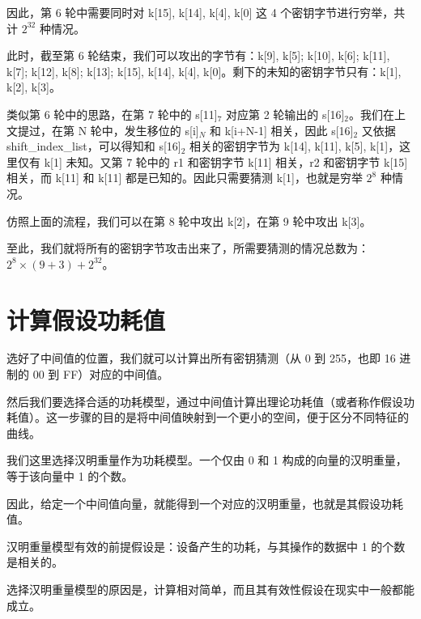 因此，第 6 轮中需要同时对 {\cnsls k[15], k[14], k[4], k[0]} 这 4 个密钥字节进行穷举，共计 $2^{32}$ 种情况。

\vspace*{0.5\baselineskip}

此时，截至第 6 轮结束，我们可以攻出的字节有：{\cnsls k[9], k[5]; k[10], k[6]; k[11], k[7]; k[12], k[8]; k[13]; k[15], k[14], k[4], k[0]}。剩下的未知的密钥字节只有：{\cnsls k[1], k[2], k[3]}。

\vspace*{0.5\baselineskip}

类似第 6 轮中的思路，在第 7 轮中的 {\cnsls s[11]$_7$} 对应第 2 轮输出的 {\cnsls s[16]$_2$}。我们在上文提过，在第 N 轮中，发生移位的 {\cnsls s[i]$_N$} 和 {\cnsls k[i+N-1]} 相关，因此 {\cnsls s[16]$_2$} 又依据 {\cnsls shift\_index\_list}，可以得知和 {\cnsls s[16]$_2$} 相关的密钥字节为 {\cnsls k[14], k[11], k[5], k[1]}，这里仅有 {\cnsls k[1]} 未知。又第 7 轮中的 {\cnsls r1} 和密钥字节 {\cnsls k[11]} 相关，{\cnsls r2} 和密钥字节 {\cnsls k[15]} 相关，而 {\cnsls k[11]} 和 {\cnsls k[11]} 都是已知的。因此只需要猜测 {\cnsls k[1]}，也就是穷举 $2^8$ 种情况。

仿照上面的流程，我们可以在第 8 轮中攻出 {\cnsls k[2]}，在第 9 轮中攻出 {\cnsls k[3]}。

\vspace*{0.5\baselineskip}

至此，我们就将所有的密钥字节攻击出来了，所需要猜测的情况总数为：$2^8 \times (9+3) + 2^{32}$。

\newpage

\section{计算假设功耗值}

选好了中间值的位置，我们就可以计算出所有密钥猜测（从 0 到 255，也即 16 进制的 00 到 FF）对应的中间值。

然后我们要选择合适的功耗模型，通过中间值计算出理论功耗值（或者称作假设功耗值）。这一步骤的目的是将中间值映射到一个更小的空间，便于区分不同特征的曲线。

我们这里选择汉明重量作为功耗模型。一个仅由 0 和 1 构成的向量的汉明重量，等于该向量中 1 的个数。

因此，给定一个中间值向量，就能得到一个对应的汉明重量，也就是其假设功耗值。

汉明重量模型有效的前提假设是：设备产生的功耗，与其操作的数据中 1 的个数是相关的。

选择汉明重量模型的原因是，计算相对简单，而且其有效性假设在现实中一般都能成立。

